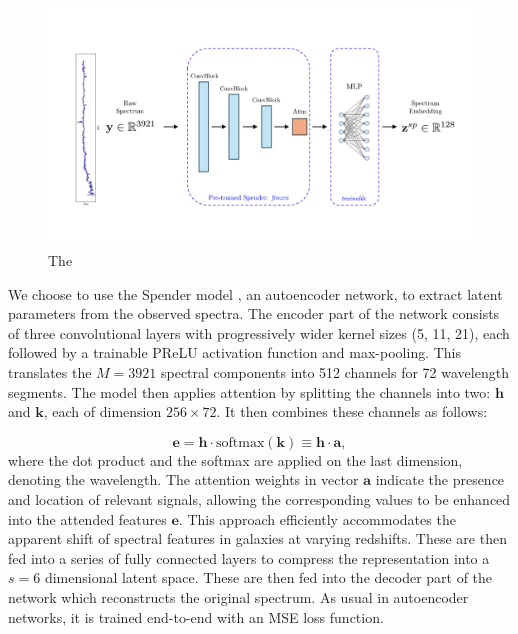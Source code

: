 \documentclass[a4paper,12pt]{article}
\begin{document}
\begin{figure}[H]
    \centering
    \includegraphics[width=\textwidth]{../figures/diagram_spender.pdf}
    \caption{The }
    \label{fig:spender}
\end{figure}


We choose to use the Spender model \cite{spender}, an autoencoder network, to extract latent parameters from the observed spectra. The encoder part of the network consists of three convolutional layers with progressively wider kernel sizes (5, 11, 21), each followed by a trainable PReLU activation function and max-pooling. This translates the $M=3921$ spectral components into 512 channels for 72 wavelength segments. The model then applies attention by splitting the channels into two: $\mathbf{h}$ and $\mathbf{k}$, each of 
dimension $256 \times 72$. It then combines these channels as follows:

\begin{equation}
    \mathbf{e} = \mathbf{h} \cdot \text{softmax}(\mathbf{k}) \equiv \mathbf{h} \cdot \mathbf{a},
\end{equation}
where the dot product and the softmax are applied on the last dimension, denoting the wavelength. The attention weights in vector $\mathbf{a}$ indicate the presence and location of relevant signals, allowing the corresponding values to be enhanced into the attended features $\mathbf{e}$. This approach efficiently accommodates the apparent shift of spectral features in galaxies at varying redshifts. These are then fed into a series of fully connected layers to compress the representation into a $s=6$ dimensional latent space. These are then fed into the decoder part of the network which reconstructs the original spectrum. As usual in autoencoder networks, it is trained end-to-end with an MSE loss function. 
\end{document}
